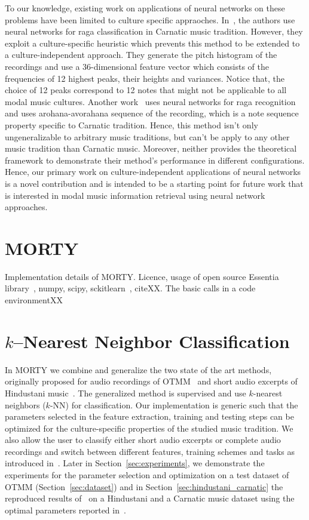 \documentclass{sig-alternate}
\begin{document}
To our knowledge, existing work on applications of neural networks on these problems have been limited to culture specific appraoches. In~\cite{neural_raga_chapter}, the authors use neural networks for raga classification in Carnatic music tradition. However, they exploit a culture-specific heuristic which prevents this method to be extended to a culture-indepen\-dent approach. They generate the pitch histogram of the recordings and use a 36-dimensional feature vector which consists of the frequencies of 12 highest peaks, their heights and variances. Notice that, the choice of 12 peaks correspond to 12 notes that might not be applicable to all modal music cultures. Another work~\cite{raga_mining} uses neural networks for raga recognition and uses arohana-avorahana sequence of the recording, which is a note sequence property specific to Carnatic tradition. Hence, this method isn't only ungeneralizable to arbitrary music traditions, but can't be apply to any other music tradition than Carnatic music. Moreover, neither provides the theoretical framework to demonstrate their method's performance in different configurations. Hence, our primary work on culture-independent applications of neural networks is a novel contribution and is intended to be a starting point for future work that is interested in modal music information retrieval using neural network approaches.

\section{MORTY}\label{sec:morty}
Implementation details of MORTY. Licence, usage of open source Essentia library~\cite{bogdanov2013essentia}, numpy, scipy, sckitlearn~\cite{scikit-learn}, citeXX. The basic calls in a code environmentXX

\section{\MakeLowercase{$k$}--Nearest Neighbor Classification}\label{sec:methodology}

In MORTY we combine and generalize the two state of the art methods, originally proposed for audio recordings of OTMM~\cite{bozkurt_makam} and short audio excerpts of Hindustani music~\cite{chordia}. The generalized method is supervised and use $k$-nearest neighbors ($k$-NN) for classification. Our implementation is generic such that the parameters selected in the feature extraction, training and testing steps can be optimized for the culture-specific properties of the studied music tradition. We also allow the user to classify either short audio excerpts or complete audio recordings and switch between different features, training schemes and tasks as introduced in~\cite{bozkurt_makam, chordia}. Later in Section~\ref{sec:experiments}, we demonstrate the experiments for the parameter selection and optimization on a test dataset of OTMM (Section~\ref{sec:dataset}) and in Section~\ref{sec:hindustani_carnatic} the reproduced results of~\cite{chordia} on a Hindustani and a Carnatic music dataset using the optimal parameters reported in~\cite{chordia}.
\end{document}
